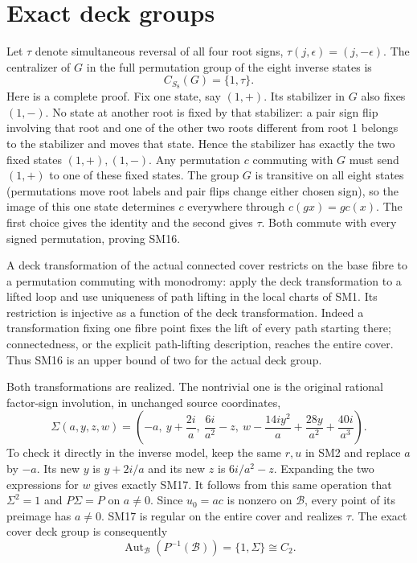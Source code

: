 \documentclass[11pt]{article}
\newcommand{\Aut}{\operatorname{Aut}}
\begin{document}
\section{Exact deck groups}
Let $\tau$ denote simultaneous reversal of all four root signs,
$\tau(j,\epsilon)=(j,-\epsilon)$. The centralizer of $G$ in
the full permutation group of the eight inverse states is
\begin{equation}
 C_{S_8}(G)=\{1,\tau\}.\tag{SM16}
\end{equation}
Here is a complete proof. Fix one state, say $(1,+)$. Its
stabilizer in $G$ also fixes $(1,-)$. No state at another root
is fixed by that stabilizer: a pair sign flip involving that
root and one of the other two roots different from root 1
belongs to the stabilizer and moves that state. Hence the
stabilizer has exactly the two fixed states $(1,+),(1,-)$.
Any permutation $c$ commuting with $G$ must send $(1,+)$ to
one of these fixed states. The group $G$ is transitive on all
eight states (permutations move root labels and pair flips
change either chosen sign), so the image of this one state
determines $c$ everywhere through $c(gx)=g c(x)$. The first
choice gives the identity and the second gives $\tau$.
Both commute with every signed permutation, proving SM16.

A deck transformation of the actual connected cover restricts
on the base fibre to a permutation commuting with monodromy:
apply the deck transformation to a lifted loop and use uniqueness
of path lifting in the local charts of SM1. Its restriction is
injective as a function of the deck transformation. Indeed a
transformation fixing one fibre point fixes the lift of every
path starting there; connectedness, or the explicit path-lifting
description, reaches the entire cover. Thus SM16 is an upper
bound of two for the actual deck group.

Both transformations are realized. The nontrivial one is the
original rational factor-sign involution, in unchanged source
coordinates,
\begin{equation}
 \Sigma(a,y,z,w)=\left(-a,\ y+\frac{2i}{a},\
 \frac{6i}{a^2}-z,\
 w-\frac{14iy^2}{a}+\frac{28y}{a^2}+\frac{40i}{a^3}\right).
 \tag{SM17}
\end{equation}
To check it directly in the inverse model, keep the same $r,u$
in SM2 and replace $a$ by $-a$. Its new $y$ is $y+2i/a$ and
its new $z$ is $6i/a^2-z$. Expanding the two expressions for
$w$ gives exactly SM17. It follows from this same operation
that $\Sigma^2=1$ and $P\Sigma=P$ on $a\ne0$. Since $u_0=ac$
is nonzero on $\mathcal B$, every point of its preimage has
$a\ne0$. SM17 is regular on the entire cover and realizes
$\tau$. The exact cover deck group is consequently
\begin{equation}
 \Aut_{\mathcal B}(P^{-1}(\mathcal B))=\{1,\Sigma\}\cong C_2.
 \tag{SM18}
\end{equation}
\end{document}
